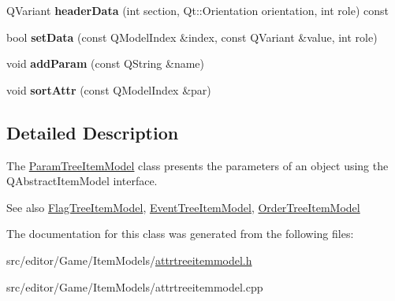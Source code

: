 \begin{DoxyCompactItemize}
\item 
\hypertarget{class_param_tree_item_model_ae59b1c5b5786ab383c5541d5129408a9}{\-Q\-Variant {\bfseries header\-Data} (int section, \-Qt\-::\-Orientation orientation, int role) const }\label{class_param_tree_item_model_ae59b1c5b5786ab383c5541d5129408a9}

\item 
\hypertarget{class_param_tree_item_model_a11957b48dec60550a4446f22ba6ef7dc}{bool {\bfseries set\-Data} (const \-Q\-Model\-Index \&index, const \-Q\-Variant \&value, int role)}\label{class_param_tree_item_model_a11957b48dec60550a4446f22ba6ef7dc}

\item 
\hypertarget{class_param_tree_item_model_a207a117e7c2381d58d6f8f49d466bfd9}{void {\bfseries add\-Param} (const \-Q\-String \&name)}\label{class_param_tree_item_model_a207a117e7c2381d58d6f8f49d466bfd9}

\item 
\hypertarget{class_param_tree_item_model_a5d4e95b0a2806773ef319cec22f8f551}{void {\bfseries sort\-Attr} (const \-Q\-Model\-Index \&par)}\label{class_param_tree_item_model_a5d4e95b0a2806773ef319cec22f8f551}

\end{DoxyCompactItemize}


\subsection{\-Detailed \-Description}
\-The \hyperlink{class_param_tree_item_model}{\-Param\-Tree\-Item\-Model} class presents the parameters of an object using the \-Q\-Abstract\-Item\-Model interface. 

\begin{DoxySeeAlso}{\-See also}
\hyperlink{class_flag_tree_item_model}{\-Flag\-Tree\-Item\-Model}, \hyperlink{class_event_tree_item_model}{\-Event\-Tree\-Item\-Model}, \hyperlink{class_order_tree_item_model}{\-Order\-Tree\-Item\-Model} 
\end{DoxySeeAlso}


\-The documentation for this class was generated from the following files\-:\begin{DoxyCompactItemize}
\item 
src/editor/\-Game/\-Item\-Models/\hyperlink{attrtreeitemmodel_8h}{attrtreeitemmodel.\-h}\item 
src/editor/\-Game/\-Item\-Models/attrtreeitemmodel.\-cpp\end{DoxyCompactItemize}
